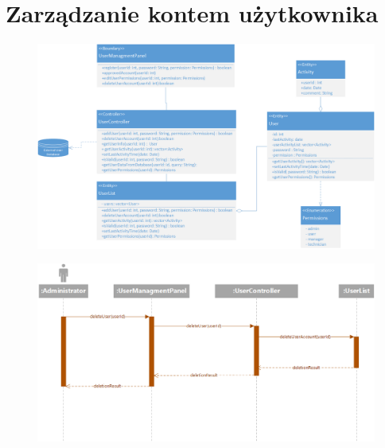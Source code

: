 \documentclass[11pt, a4paper, oneside]{report}
\begin{document}
\section{Zarządzanie kontem użytkownika}
\begin{figure}[H]
\centering
\includegraphics[scale=0.5]{zarzadzanie_uzytkownikami_class.png}
\end{figure}
\begin{figure}[H]
\centering
\includegraphics[scale=0.5]{zarzadzanie_uzytkownikami_sequence.png}
\end{figure}
\end{document}
